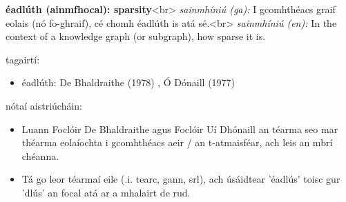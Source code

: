 \documentclass{article}
\begin{document}
\textbf{éadlúth (ainmfhocal): sparsity}<br>
\textit{sainmhíniú (ga):} I gcomhthéacs graif eolais (nó fo-ghraif), cé chomh éadlúth is atá sé.<br>
\textit{sainmhíniú (en):} In the context of a knowledge graph (or subgraph), how sparse it is.

tagairtí:
\begin{itemize}
	\item éadlúth: De Bhaldraithe (1978) \cite{de-bhaldraithe}, Ó Dónaill (1977) \cite{odonaill}
\end{itemize}

nótaí aistriúcháin:
\begin{itemize}
	\item Luann Foclóir De Bhaldraithe agus Foclóir Uí Dhónaill an téarma seo  mar théarma eolaíochta i gcomhthéacs aeir / an t-atmaisféar, ach leis an mbrí chéanna.
	\item Tá go leor téarmaí eile (.i. tearc, gann, srl), ach úsáidtear 'éadlús' toisc gur 'dlús' an focal atá ar a mhalairt de rud.
\end{itemize}



            \printbibliography[title={Tagairtí}]
            
\end{document}
